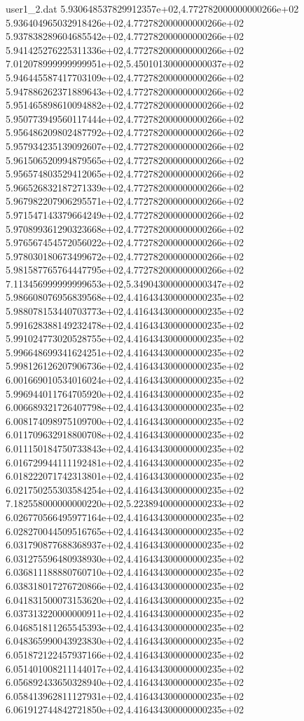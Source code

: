 \begin{filecontents}{user1_2.dat}
5.930648537829912357e+02,4.772782000000000266e+02
5.936404965032918426e+02,4.772782000000000266e+02
5.937838289604685542e+02,4.772782000000000266e+02
5.941425276225311336e+02,4.772782000000000266e+02
7.012078999999999951e+02,5.450101300000000037e+02
5.946445587417703109e+02,4.772782000000000266e+02
5.947886262371889643e+02,4.772782000000000266e+02
5.951465898610094882e+02,4.772782000000000266e+02
5.950773949560117444e+02,4.772782000000000266e+02
5.956486209802487792e+02,4.772782000000000266e+02
5.957934235139092607e+02,4.772782000000000266e+02
5.961506520994879565e+02,4.772782000000000266e+02
5.956574803529412065e+02,4.772782000000000266e+02
5.966526832187271339e+02,4.772782000000000266e+02
5.967982207906295571e+02,4.772782000000000266e+02
5.971547143379664249e+02,4.772782000000000266e+02
5.970899361290323668e+02,4.772782000000000266e+02
5.976567454572056022e+02,4.772782000000000266e+02
5.978030180673499672e+02,4.772782000000000266e+02
5.981587765764447795e+02,4.772782000000000266e+02
7.113456999999999653e+02,5.349043000000000347e+02
5.986608076956839568e+02,4.416434300000000235e+02
5.988078153440703773e+02,4.416434300000000235e+02
5.991628388149232478e+02,4.416434300000000235e+02
5.991024773020528755e+02,4.416434300000000235e+02
5.996648699341624251e+02,4.416434300000000235e+02
5.998126126207906736e+02,4.416434300000000235e+02
6.001669010534016024e+02,4.416434300000000235e+02
5.996944011764705920e+02,4.416434300000000235e+02
6.006689321726407798e+02,4.416434300000000235e+02
6.008174098975109700e+02,4.416434300000000235e+02
6.011709632918800708e+02,4.416434300000000235e+02
6.011150184750733843e+02,4.416434300000000235e+02
6.016729944111192481e+02,4.416434300000000235e+02
6.018222071742313801e+02,4.416434300000000235e+02
6.021750255303584254e+02,4.416434300000000235e+02
7.182558000000000220e+02,5.223894000000000233e+02
6.026770566495977164e+02,4.416434300000000235e+02
6.028270044509516765e+02,4.416434300000000235e+02
6.031790877688368937e+02,4.416434300000000235e+02
6.031275596480938930e+02,4.416434300000000235e+02
6.036811188880760710e+02,4.416434300000000235e+02
6.038318017276720866e+02,4.416434300000000235e+02
6.041831500073153620e+02,4.416434300000000235e+02
6.037313220000000911e+02,4.416434300000000235e+02
6.046851811265545393e+02,4.416434300000000235e+02
6.048365990043923830e+02,4.416434300000000235e+02
6.051872122457937166e+02,4.416434300000000235e+02
6.051401008211144017e+02,4.416434300000000235e+02
6.056892433650328940e+02,4.416434300000000235e+02
6.058413962811127931e+02,4.416434300000000235e+02
6.061912744842721850e+02,4.416434300000000235e+02

\end{filecontents}
